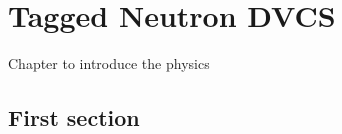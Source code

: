 \chapter{Tagged Neutron DVCS}
\label{chap:physics}

Chapter to introduce the physics

\section{First section}

